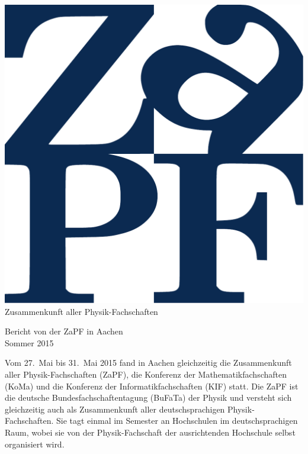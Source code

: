 \documentclass{scrartcl}
\begin{document}
\hspace{0.74\textwidth}
\begin{minipage}{0.25\textwidth}
      \vspace{-1cm}
      \centering
      \includegraphics[width=.89\textwidth]{logo.pdf}
      \small Zusammenkunft aller Physik-Fachschaften
\end{minipage}

\begin{center}
      \vspace{1.5cm}
      \huge{Bericht von der ZaPF in Aachen \\ Sommer 2015}
      \vspace{1cm}
\end{center}

Vom  27.\ Mai bis 31.\ Mai 2015 fand in Aachen gleichzeitig die Zusammenkunft
aller Physik-Fachschaften (ZaPF), die Konferenz der Mathematikfachschaften
(KoMa) und die Konferenz der Informatikfachschaften (KIF) statt. Die ZaPF ist
die deutsche  Bundesfachschaftentagung (BuFaTa) der Physik und versteht sich
gleichzeitig auch  als Zusammenkunft aller deutschsprachigen
Physik-Fachschaften. Sie tagt einmal im Semester an Hochschulen im
deutschsprachigen Raum, wobei sie  von der  Physik-Fachschaft der ausrichtenden
Hochschule selbst organisiert wird.
\end{document}
